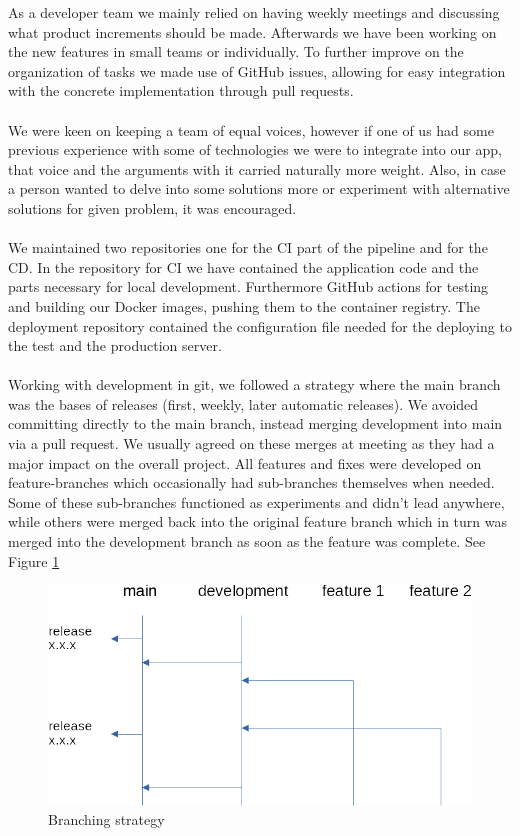 \documentclass[12pt]{article}
\begin{document}
As a developer team we mainly relied on having weekly meetings and discussing what product increments should be made. Afterwards we have been working on the new features in small teams or individually. To further improve on the organization of tasks we made use of GitHub issues, allowing for easy integration with the concrete implementation through pull requests.
\\\\
We were keen on keeping a team of equal voices, however if one of us had some previous experience with some of technologies we were to integrate into our app, that voice and the arguments with it carried naturally more weight. Also, in case a person wanted to delve into some solutions more or experiment with alternative solutions for given problem, it was encouraged. 
\\\\
We maintained two repositories one for the CI part of the pipeline and for the CD. In the repository for CI we have contained the application code and the parts necessary for local development. Furthermore GitHub actions for testing and building our Docker images, pushing them to the container registry. The deployment repository contained the configuration file needed for the deploying to the test and the production server.
\\\\
Working with development in git, we followed a strategy where the main branch was the bases of releases (first, weekly, later automatic releases). We avoided committing directly to the main branch, instead merging development into main via a pull request. We usually agreed on these merges at meeting as they had a major impact on the overall project. All features and fixes were developed on feature-branches which occasionally had sub-branches themselves when needed. Some of these sub-branches functioned as experiments and didn't lead anywhere, while others were merged back into the original feature branch which in turn was merged into the development branch as soon as the feature was complete. See Figure \ref{fig:branching}
\begin{figure}[h!]
    \centering
    \includegraphics[width=12cm]{branching.png}
    \caption{Branching strategy}
    \label{fig:branching}
\end{figure}
\end{document}
